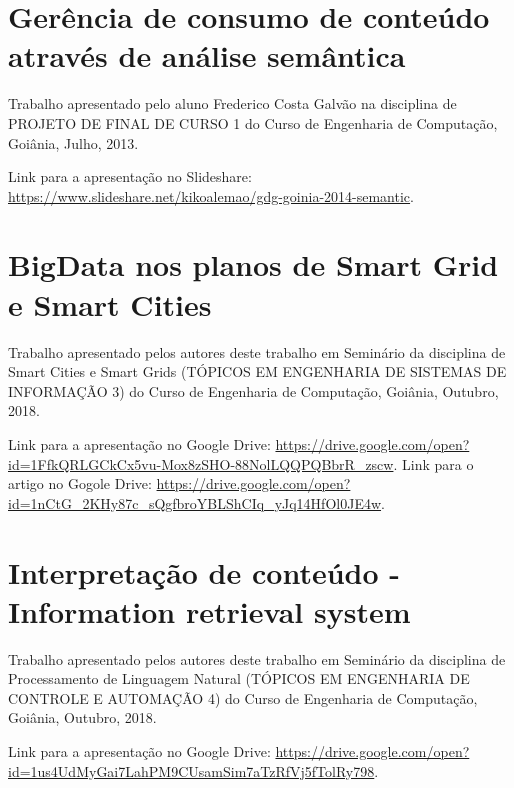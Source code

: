 \documentclass[
	12pt,				%
	openright,			%
	twoside,			%
	a4paper,			%
	english,			%
	french,				%
	spanish,			%
	brazil				%
	]{abntex2}
\begin{document}

\begin{apendicesenv}

\partapendices



\chapter{Gerência de consumo de conteúdo através de análise semântica} \label{a:PFC1}

Trabalho apresentado pelo aluno Frederico Costa Galvão na disciplina de PROJETO DE FINAL DE CURSO 1 do Curso de Engenharia de Computação, Goiânia, Julho, 2013.

Link para a apresentação no Slideshare: \url{https://www.slideshare.net/kikoalemao/gdg-goinia-2014-semantic}.

\chapter{BigData nos planos de Smart Grid e Smart Cities} \label{a:BigDataSmartCity}

Trabalho apresentado pelos autores deste trabalho em Seminário da disciplina de Smart Cities e Smart Grids (TÓPICOS EM ENGENHARIA DE SISTEMAS DE INFORMAÇÃO 3) do Curso de Engenharia de Computação, Goiânia, Outubro, 2018.

Link para a apresentação no Google Drive: \url{https://drive.google.com/open?id=1FfkQRLGCkCx5vu-Mox8zSHO-88NolLQQPQBbrR_zscw}.
Link para o artigo no Gogole Drive: \url{https://drive.google.com/open?id=1nCtG_2KHy87c_sQgfbroYBLShCIq_yJq14HfOl0JE4w}.

\chapter{Interpretação de conteúdo - Information retrieval system} \label{a:InformationRetrievalPLN}

Trabalho apresentado pelos autores deste trabalho em Seminário da disciplina de Processamento de Linguagem Natural (TÓPICOS EM ENGENHARIA DE CONTROLE E AUTOMAÇÃO 4) do Curso de Engenharia de Computação, Goiânia, Outubro, 2018.

Link para a apresentação no Google Drive: \url{https://drive.google.com/open?id=1us4UdMyGai7LahPM9CUsamSim7aTzRfVj5fTolRy798}.


\end{apendicesenv}


\printindex
\end{document}
